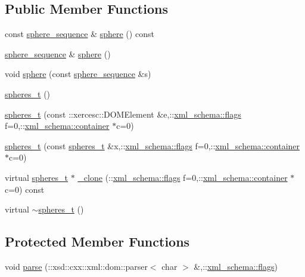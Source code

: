 \subsection*{Public Member Functions}
\begin{DoxyCompactItemize}
\item 
const \hyperlink{classspheres__t_ae9b4b35c1b290ab0ce8724f773d3b553}{sphere\-\_\-sequence} \& \hyperlink{classspheres__t_a67fc4fe85acc0c7b71ebb222607e6922}{sphere} () const 
\item 
\hyperlink{classspheres__t_ae9b4b35c1b290ab0ce8724f773d3b553}{sphere\-\_\-sequence} \& \hyperlink{classspheres__t_a96c1fff53d94892c5c22e36c222735e1}{sphere} ()
\item 
void \hyperlink{classspheres__t_a798b35608f33d89d6f4cf54de932af5e}{sphere} (const \hyperlink{classspheres__t_ae9b4b35c1b290ab0ce8724f773d3b553}{sphere\-\_\-sequence} \&s)
\item 
\hyperlink{classspheres__t_a7337414c63d7510a539bcba70bba23a6}{spheres\-\_\-t} ()
\item 
\hyperlink{classspheres__t_a7110ac04fda8a3b78be4baf6ad750238}{spheres\-\_\-t} (const \-::xercesc\-::\-D\-O\-M\-Element \&e,\-::\hyperlink{namespacexml__schema_a0612287d030cb2732d31a45b258fdc87}{xml\-\_\-schema\-::flags} f=0,\-::\hyperlink{namespacexml__schema_ada9aa30dc722e93ee2ed7243085402a5}{xml\-\_\-schema\-::container} $\ast$c=0)
\item 
\hyperlink{classspheres__t_ad0379285dad67d109b42523a9a54f875}{spheres\-\_\-t} (const \hyperlink{classspheres__t}{spheres\-\_\-t} \&x,\-::\hyperlink{namespacexml__schema_a0612287d030cb2732d31a45b258fdc87}{xml\-\_\-schema\-::flags} f=0,\-::\hyperlink{namespacexml__schema_ada9aa30dc722e93ee2ed7243085402a5}{xml\-\_\-schema\-::container} $\ast$c=0)
\item 
virtual \hyperlink{classspheres__t}{spheres\-\_\-t} $\ast$ \hyperlink{classspheres__t_a0121457c1787c97cc5ac430685cb4158}{\-\_\-clone} (\-::\hyperlink{namespacexml__schema_a0612287d030cb2732d31a45b258fdc87}{xml\-\_\-schema\-::flags} f=0,\-::\hyperlink{namespacexml__schema_ada9aa30dc722e93ee2ed7243085402a5}{xml\-\_\-schema\-::container} $\ast$c=0) const 
\item 
virtual \hyperlink{classspheres__t_a92092f0b9c1862e5cfbd46d7919a8793}{$\sim$spheres\-\_\-t} ()
\end{DoxyCompactItemize}
\subsection*{Protected Member Functions}
\begin{DoxyCompactItemize}
\item 
void \hyperlink{classspheres__t_a589f664ec291de005194618d7a9cc5a2}{parse} (\-::xsd\-::cxx\-::xml\-::dom\-::parser$<$ char $>$ \&,\-::\hyperlink{namespacexml__schema_a0612287d030cb2732d31a45b258fdc87}{xml\-\_\-schema\-::flags})
\end{DoxyCompactItemize}
